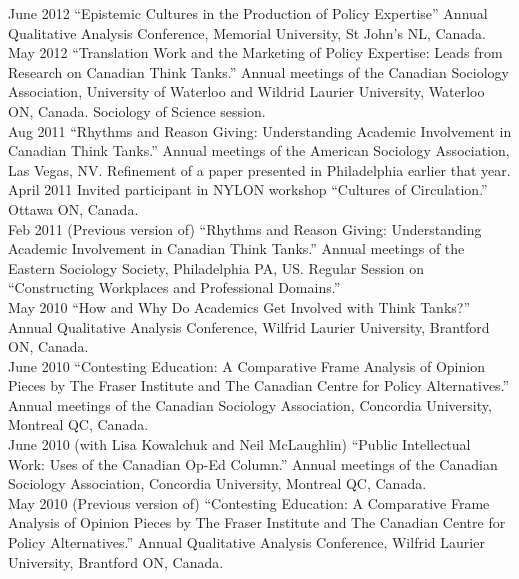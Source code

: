 \documentclass[9pt,usenames,dvipsnames]{article}
\begin{document}
\ind June 2012 ``Epistemic Cultures in the Production of Policy Expertise'' Annual Qualitative Analysis Conference, Memorial University, St John's NL, Canada.\\

\ind May 2012 ``Translation Work and the Marketing of Policy Expertise: Leads from Research on Canadian Think Tanks.'' Annual meetings of the Canadian Sociology Association, University of Waterloo and Wildrid Laurier University, Waterloo ON, Canada. Sociology of Science session.\\

\ind Aug 2011 ``Rhythms and Reason Giving: Understanding Academic Involvement in Canadian Think Tanks.'' Annual meetings of the American Sociology Association, Las Vegas, NV. Refinement of a paper presented in Philadelphia earlier that year. \\

\ind April 2011 Invited participant in NYLON workshop ``Cultures of Circulation.'' Ottawa ON, Canada.\\

\ind Feb 2011 (Previous version of) ``Rhythms and Reason Giving: Understanding Academic Involvement in Canadian Think Tanks.'' Annual meetings of the Eastern Sociology Society, Philadelphia PA, US. Regular Session on ``Constructing Workplaces and Professional Domains.''\\

\ind May 2010 ``How and Why Do Academics Get Involved with Think Tanks?'' Annual Qualitative Analysis Conference, Wilfrid Laurier University, Brantford ON, Canada.\\

\ind June 2010 ``Contesting Education: A Comparative Frame Analysis of Opinion Pieces by The Fraser Institute and The Canadian Centre for Policy Alternatives.'' Annual meetings  of the Canadian Sociology Association, Concordia University, Montreal QC, Canada.\\

\ind June 2010 (with Lisa Kowalchuk and Neil McLaughlin) ``Public Intellectual Work: Uses of the Canadian Op-Ed Column.'' Annual meetings of the Canadian Sociology Association, Concordia University, Montreal QC, Canada.\\

\ind May 2010 (Previous version of) ``Contesting Education: A Comparative Frame Analysis of Opinion Pieces by The Fraser Institute and The Canadian Centre for Policy Alternatives.'' Annual Qualitative Analysis Conference, Wilfrid Laurier University, Brantford ON, Canada.\\
\end{document}

